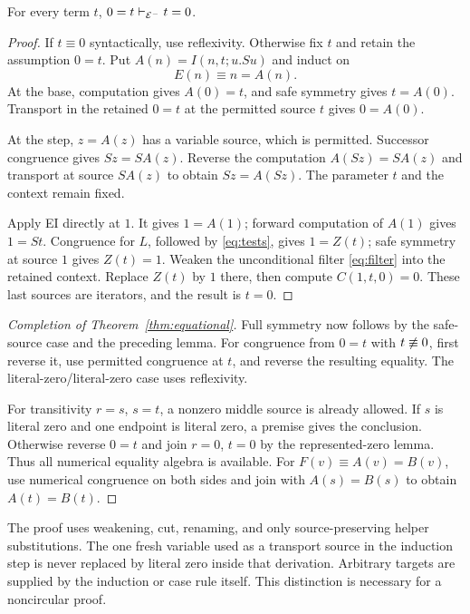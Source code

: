 \begin{lemma}
For every term $t$, $0=t\vdash_{\mathcal E^{-}}t=0$.
\end{lemma}
\begin{proof}
If $t\equiv0$ syntactically, use reflexivity. Otherwise fix $t$ and retain the
assumption $0=t$. Put $A(n)=I(n,t;u.Su)$ and induct on
\[
 E(n)\equiv n=A(n).
\]
At the base, computation gives $A(0)=t$, and safe symmetry gives
$t=A(0)$. Transport in the retained $0=t$ at the permitted source $t$
gives $0=A(0)$.

At the step, $z=A(z)$ has a variable source, which is permitted.
Successor congruence gives $Sz=S A(z)$. Reverse the computation
$A(Sz)=S A(z)$ and transport at source $S A(z)$ to obtain $Sz=A(Sz)$.
The parameter $t$ and the context remain fixed.

Apply EI directly at $1$. It gives $1=A(1)$; forward computation of
$A(1)$ gives $1=St$. Congruence for $L$, followed by
\eqref{eq:tests}, gives $1=Z(t)$; safe symmetry at source $1$ gives
$Z(t)=1$. Weaken the unconditional filter \eqref{eq:filter} into the
retained context. Replace $Z(t)$ by $1$ there, then compute
$C(1,t,0)=0$. These last sources are iterators, and the result is $t=0$.
\end{proof}

\begin{proof}[Completion of Theorem~\ref{thm:equational}]
Full symmetry now follows by the safe-source case and the preceding lemma.
For congruence from $0=t$ with $t\not\equiv0$, first reverse it, use
permitted congruence at $t$, and reverse the resulting equality. The
literal-zero/literal-zero case uses reflexivity.

For transitivity $r=s$, $s=t$, a nonzero middle source is already allowed.
If $s$ is literal zero and one endpoint is literal zero, a premise gives
the conclusion. Otherwise reverse $0=t$ and join $r=0$, $t=0$ by the
represented-zero lemma. Thus all numerical equality algebra is available.
For $F(v)\equiv A(v)=B(v)$, use numerical congruence on both sides and
join with $A(s)=B(s)$ to obtain $A(t)=B(t)$.
\end{proof}

The proof uses weakening, cut, renaming, and only source-preserving helper
substitutions. The one fresh variable used as a transport source in the
induction step is never replaced by literal zero inside that derivation.
Arbitrary targets are supplied by the induction or case rule itself. This
distinction is necessary for a noncircular proof.

